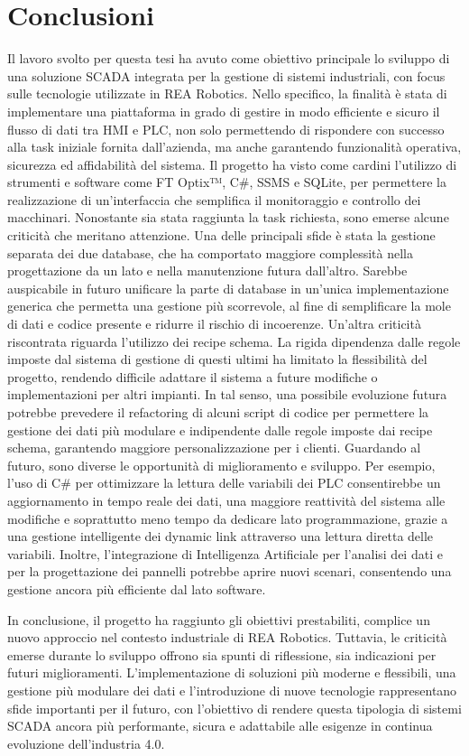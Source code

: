 \chapter{Conclusioni}

Il lavoro svolto per questa tesi ha avuto come obiettivo principale lo sviluppo di una soluzione SCADA integrata per la gestione di sistemi industriali, con focus sulle tecnologie utilizzate in REA Robotics. Nello specifico, la finalità è stata di implementare una piattaforma in grado di gestire in modo efficiente e sicuro il flusso di dati tra HMI e PLC, non solo permettendo di rispondere con successo alla task iniziale fornita dall'azienda, ma anche garantendo funzionalità operativa, sicurezza ed affidabilità del sistema. Il progetto ha visto come cardini l'utilizzo di strumenti e software come FT Optix™, C\#, SSMS e SQLite, per permettere la realizzazione di un'interfaccia che semplifica il monitoraggio e controllo dei macchinari. Nonostante sia stata raggiunta la task richiesta, sono emerse alcune criticità che meritano attenzione. Una delle principali sfide è stata la gestione separata dei due database, che ha comportato maggiore complessità nella progettazione da un lato e nella manutenzione futura dall'altro. Sarebbe auspicabile in futuro unificare la parte di database in un'unica implementazione generica che permetta una gestione più scorrevole, al fine di semplificare la mole di dati e codice presente e ridurre il rischio di incoerenze. Un'altra criticità riscontrata riguarda l'utilizzo dei recipe schema. La rigida dipendenza dalle regole imposte dal sistema di gestione di questi ultimi ha limitato la flessibilità del progetto, rendendo difficile adattare il sistema a future modifiche o implementazioni per altri impianti. In tal senso, una possibile evoluzione futura potrebbe prevedere il refactoring di alcuni script di codice per permettere la gestione dei dati più modulare e indipendente dalle regole imposte dai recipe schema, garantendo maggiore personalizzazione per i clienti. Guardando al futuro, sono diverse le opportunità di miglioramento e sviluppo. Per esempio, l'uso di C\# per ottimizzare la lettura delle variabili dei PLC consentirebbe un aggiornamento in tempo reale dei dati, una maggiore reattività del sistema alle modifiche e soprattutto meno tempo da dedicare lato programmazione, grazie a una gestione intelligente dei dynamic link attraverso una lettura diretta delle variabili. Inoltre, l'integrazione di Intelligenza Artificiale per l'analisi dei dati e per la progettazione dei pannelli potrebbe aprire nuovi scenari, consentendo una gestione ancora più efficiente dal lato software.

In conclusione, il progetto ha raggiunto gli obiettivi prestabiliti, complice un nuovo approccio nel contesto industriale di REA Robotics. Tuttavia, le criticità emerse durante lo sviluppo offrono sia spunti di riflessione, sia indicazioni per futuri miglioramenti. L'implementazione di soluzioni più moderne e flessibili, una gestione più modulare dei dati e l'introduzione di nuove tecnologie rappresentano sfide importanti per il futuro, con l'obiettivo di rendere questa tipologia di sistemi SCADA ancora più performante, sicura e adattabile alle esigenze in continua evoluzione dell'industria 4.0.